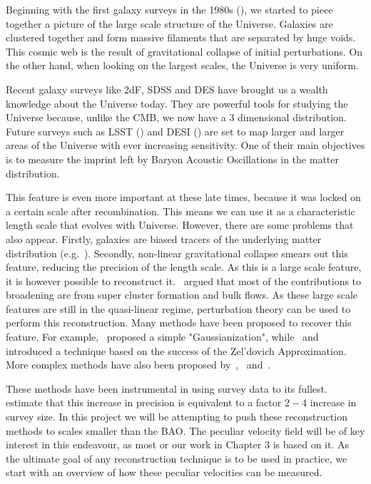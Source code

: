 Beginning with the first galaxy surveys in the 1980s (\cite{Davis_galaxy_survey}), we started to piece together a picture of the large scale structure of the Universe. Galaxies are clustered together and form massive filaments that are separated by huge voids. This cosmic web is the result of gravitational collapse of initial perturbations. On the other hand, when looking on the largest scales, the Universe is very uniform.

Recent galaxy surveys like 2dF, SDSS and DES  have brought us a wealth knowledge about the Universe today. They are powerful tools for studying the Universe because, unlike the CMB, we now have a 3 dimensional distribution. Future surveys such as LSST (\cite{2009arXiv0912.0201L}) and DESI (\cite{2013arXiv1308.0847L}) are set to map larger and larger areas of the Universe with ever increasing sensitivity. One of their main objectives is to measure the imprint left by Baryon Acoustic Oscillations in the matter distribution. 

This feature is even more important at these late times, because it was locked on a certain scale after recombination. This means we can use it as a characteristic length scale that evolves with Universe. However, there are some problems that also appear. Firstly, galaxies are biased tracers of the underlying matter distribution (e.g.~\cite{2016arXiv161109787D}). Secondly, non-linear gravitational collapse smears out this feature, reducing the precision of the length scale. As this is a large scale feature, it is however possible to reconstruct it.~\cite{Eisenstein_BAOpeak_reconstruction} argued that most of the contributions to broadening are from super cluster formation and bulk flows. As these large scale features are still in the quasi-linear regime, perturbation theory can be used to perform this reconstruction. Many methods have been proposed to recover this feature. For example,~\cite{1992MNRAS.254..315W} proposed a simple "Gaussianization", while~\cite{1992ApJ...391..443N} and~\cite{1993ApJ...405..449G} introduced a technique based on the success of the Zel'dovich Approximation. More complex methods have also been proposed by~\cite{1999MNRAS.308..763M},~\cite{1997MNRAS.285..793C} and~\cite{2003MNRAS.346..501B}.

These methods have been instrumental in using survey data to its fullest.~\cite{2013PhR...530...87W} estimate that this increase in precision is equivalent to a factor $2-4$ increase in survey size. In this project we will be attempting to push these reconstruction methods to scales smaller than the BAO. The peculiar velocity field will be of key interest in this endeavour, as most or our work in Chapter 3 is based on it. As the ultimate goal of any reconstruction technique is to be used in practice, we start with an overview of how these peculiar velocities can be measured. 

